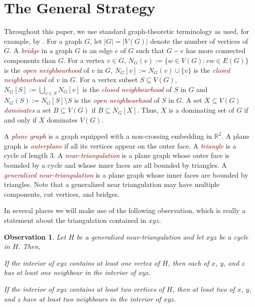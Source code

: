 \documentclass{article}
\newtheorem{obs}{Observation}
\newcommand{\defin}[1]{\emph{\textcolor{Maroon}{#1}}}
\theoremstyle{definition}
\begin{document}
\section{The General Strategy}
\label{strategy}

Throughout this paper, we use standard graph-theoretic terminology as used, for example, by \citet{diestel:graph}.
For a graph $G$, let $|G|=|V(G)|$ denote the number of vertices of $G$.  A \defin{bridge} in a graph $G$ is an edge $e$ of $G$ such that $G-e$ has more connected components than $G$.  For a vertex $v\in G$, $N_G(v):=\{w\in V(G):vw\in E(G)\}$ is the \defin{open neighbourhood} of $v$ in $G$,  $N_G[v]:=N_G(v)\cup\{v\}$ is the \defin{closed neighbourhood} of $v$ in $G$.  For a vertex subset $S\subseteq V(G)$, $N_G[S]:=\bigcup_{v\in S} N_{G}[v]$ is the \defin{closed neighbourhood} of $S$ in $G$ and $N_G(S):=N_G[S]\setminus S$ is the \defin{open neighbourhood} of $S$ in $G$.  A set $X\subseteq V(G)$ \defin{dominates} a set $B\subseteq V(G)$ if $B\subseteq N_G[X]$.  Thus, $X$ is a dominating set of $G$ if and only if $X$ dominates $V(G)$.

A \defin{plane graph} is a graph equipped with a non-crossing embedding in $\mathbb{R}^2$.  A plane graph is \defin{outerplane} if all its vertices appear on the outer face.  A \defin{triangle} is a cycle of length $3$. A \defin{near-triangulation} is a plane graph whose outer face is bounded by a cycle and whose inner faces are all bounded by triangles.  A \defin{generalized near-triangulation} is a plane graph whose inner faces are bounded by triangles. Note that a generalized near triangulation may have multiple components, cut vertices, and bridges.

In several places we will make use of the following observation, which is really a statement about the triangulation contained in $xyz$.
\begin{obs}\label{useful_little_guy}
  Let $H$ be a generalized near-triangulation and let $xyz$ be a cycle in $H$.  Then,
  \begin{compactenum}
    \item If the interior of $xyz$ contains at least one vertex of $H$, then each of $x$, $y$, and $z$ has at least one neighbour in the interior of $xyz$.

    \item If the interior of $xyz$ contains at least two vertices of $H$, then at least two of $x$, $y$, and $z$ have at least two neighbours in the interior of $xyz$.
  \end{compactenum}
\end{obs}
\end{document}
